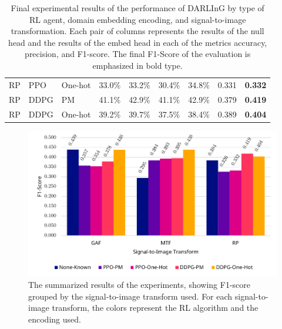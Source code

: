 \begin{table}[]
{\begin{tabular}{@{}lllrrrrrr@{}}
		RP        & PPO      & One-hot  & 33.0\%    & 33.2\%     & 30.4\%    & 34.8\%     & 0.331     & \textbf{0.332} \\
		RP        & DDPG     & PM       & 41.1\%    & 42.9\%     & 41.1\%    & 42.9\%     & 0.379     & \textbf{0.419} \\
		RP        & DDPG     & One-hot  & 39.2\%    & 39.7\%     & 37.5\%    & 38.4\%     & 0.389     & \textbf{0.404} \\ \bottomrule
	\end{tabular}
	}
	\caption{Final experimental results of the performance of DARLInG by type of RL agent, domain embedding encoding, and signal-to-image transformation. Each pair of columns represents the results of the null head and the results of the embed head in each of the metrics accuracy, precision, and F1-score. The final F1-Score of the evaluation is emphasized in bold type.}
	\label{tab:final-results}
\end{table}

\begin{figure}
	\centering
	\includegraphics[width=6in]{figures/results_main}
	\caption{The summarized results of the experiments, showing F1-score grouped by the signal-to-image transform used. For each signal-to-image transform, the colors represent the RL algorithm and the encoding used.}
	\label{fig:results-main}
\end{figure}

